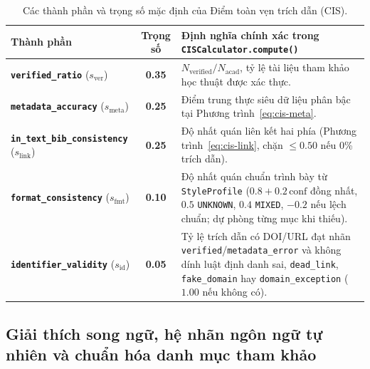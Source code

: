 {\setlength{\tabcolsep}{3.5pt}
\begin{table}[!htbp]
\centering
\caption{Các thành phần và trọng số mặc định của Điểm toàn vẹn trích dẫn (CIS).}\label{tab:cis}
\begin{tabular}{|L{0.31}|C{0.11}|L{0.58}|}
\hline
\textbf{Thành phần} & \textbf{Trọng số} & \textbf{Định nghĩa chính xác trong \texttt{CISCalculator.compute()}} \\
\hline
\textbf{\texttt{verified\_ratio}} ($s_{\text{ver}}$) & \textbf{0.35} & $N_{\text{verified}} / N_{\text{acad}}$, tỷ lệ tài liệu tham khảo học thuật được xác thực. \\
\hline
\textbf{\texttt{metadata\_accuracy}} ($s_{\text{meta}}$) & \textbf{0.25} & Điểm trung thực siêu dữ liệu phân bậc tại Phương trình~\eqref{eq:cis-meta}. \\
\hline
\textbf{\texttt{in\_text\_bib\_consistency}} ($s_{\text{link}}$) & \textbf{0.25} & Độ nhất quán liên kết hai phía (Phương trình~\eqref{eq:cis-link}, chặn $\le 0.50$ nếu 0\% trích dẫn). \\
\hline
\textbf{\texttt{format\_consistency}} ($s_{\text{fmt}}$) & \textbf{0.10} & Độ nhất quán chuẩn trình bày từ \texttt{StyleProfile} ($0.8 + 0.2\,\text{conf}$ đồng nhất, $0.5$ \texttt{UNKNOWN}, $0.4$ \texttt{MIXED}, $-0.2$ nếu lệch chuẩn; dự phòng từng mục khi thiếu). \\
\hline
\textbf{\texttt{identifier\_validity}} ($s_{\text{id}}$) & \textbf{0.05} & Tỷ lệ trích dẫn có DOI/URL đạt nhãn \texttt{verified}/\texttt{metadata\_error} và không dính luật định danh sai, \texttt{dead\_link}, \texttt{fake\_domain} hay \texttt{domain\_exception} ($1.00$ nếu không có). \\
\hline
\end{tabular}
\end{table}
}

\subsection[Giải thích song ngữ, nhãn tự nhiên và chuẩn hóa danh mục]{Giải thích song ngữ, hệ nhãn ngôn ngữ tự nhiên và chuẩn hóa danh mục tham khảo}

